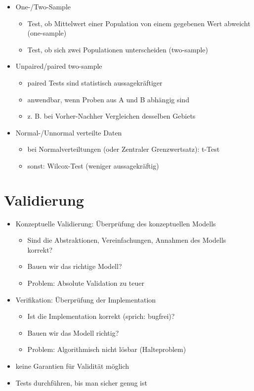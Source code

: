 \documentclass[nonacm=true, language=german]{acmart}
\begin{document}
\begin{itemize}
    \item One-/Two-Sample
    \begin{itemize}
        \item Test, ob Mittelwert einer Population von einem gegebenen Wert abweicht (one-sample)
        \item Test, ob sich zwei Populationen unterscheiden (two-sample)
    \end{itemize}
    \item Unpaired/paired two-sample
    \begin{itemize}
        \item paired Tests sind statistisch aussagekräftiger
        \item anwendbar, wenn Proben aus A und B abhängig sind
        \item z. B. bei Vorher-Nachher Vergleichen desselben Gebiets
    \end{itemize}
    \item Normal-/Unnormal verteilte Daten
    \begin{itemize}
        \item bei Normalverteiltungen (oder Zentraler Grenzwertsatz): t-Test
        \item sonst: Wilcox-Test (weniger aussagekräftig)
    \end{itemize}
\end{itemize}

\newpage

\section{Validierung}

\begin{itemize}
    \item Konzeptuelle Validierung: Überprüfung des konzeptuellen Modells
    \begin{itemize}
        \item Sind die Abstraktionen, Vereinfachungen, Annahmen des Modells korrekt?
        \item Bauen wir das richtige Modell?
        \item Problem: Absolute Validation zu teuer
    \end{itemize}
    \item Verifikation: Überprüfung der Implementation
    \begin{itemize}
        \item Ist die Implementation korrekt (sprich: bugfrei)?
        \item Bauen wir das Modell richtig?
        \item Problem: Algorithmisch nicht lösbar (Halteproblem)
    \end{itemize}
    \item keine Garantien für Validität möglich
    \item Tests durchführen, bis man sicher genug ist
\end{itemize}
\end{document}
